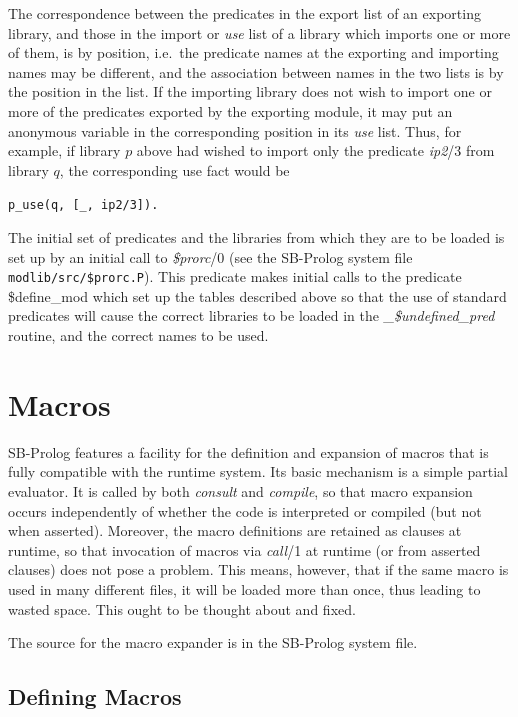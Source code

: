 The correspondence between the predicates in the export list of an exporting
library,
and those in the import or {\em use} list of a library which imports one or
more of them, is by position, i.e.\ the predicate names at the exporting and importing names may be different, and
the association between names in the two lists is by the position in the list.
If the importing library does not wish to import one or more of the predicates
exported by the exporting module,
it may put an anonymous variable in the corresponding position in its {\em use}
list.
Thus, for example, if library $p$ above had wished to import only the predicate
{\em ip2}/3 from library $q$, the corresponding use fact would be
\begin{center}
{\tt p\_use(q, [\_, ip2/3]).}
\end{center}

The initial set of predicates and the libraries from which they are to be
loaded is set up by an initial call to {\em \$prorc}/0
(see the SB-Prolog system file {\tt modlib/src/\$prorc.P}).
This predicate makes initial calls to the predicate \$define\_mod which set up
the tables described above so that the use of standard predicates will cause
the correct libraries to be loaded in the {\em \_\$undefined\_pred} routine,
and the correct names to be used.

\section{Macros}\label{macros}
SB-Prolog features a facility for the definition and expansion of macros that
is fully compatible with the runtime system.
Its basic mechanism is a simple partial evaluator.
It is called by both {\em consult} and {\em compile},
so that macro expansion occurs independently of whether the code is interpreted
or compiled (but not when asserted).
Moreover, the macro definitions are retained as clauses at runtime, so
that invocation of macros via {\em call}/1 at runtime (or from asserted clauses)
does not pose a problem.
This means, however, that if the same macro is used in many different files,
it will be loaded more than once, thus leading to wasted space.
This ought to be thought about and fixed.

The source for the macro expander is in the SB-Prolog system file.

\subsection{Defining Macros}

